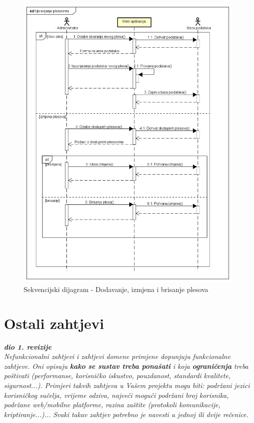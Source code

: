 		\begin{figure}[H]
			\includegraphics[scale=0.4]{slike/SD-Upravljanje plesovima.PNG} %
			\centering
			\caption{Sekvencijski dijagram - Dodavanje, izmjena i brisanje plesova}
			\label{fig:administr}
		\end{figure}
		

				\eject
	
		\section{Ostali zahtjevi}
		
			\textbf{\textit{dio 1. revizije}}\\
		 
			 \textit{Nefunkcionalni zahtjevi i zahtjevi domene primjene dopunjuju funkcionalne zahtjeve. Oni opisuju \textbf{kako se sustav treba ponašati} i koja \textbf{ograničenja} treba poštivati (performanse, korisničko iskustvo, pouzdanost, standardi kvalitete, sigurnost...). Primjeri takvih zahtjeva u Vašem projektu mogu biti: podržani jezici korisničkog sučelja, vrijeme odziva, najveći mogući podržani broj korisnika, podržane web/mobilne platforme, razina zaštite (protokoli komunikacije, kriptiranje...)... Svaki takav zahtjev potrebno je navesti u jednoj ili dvije rečenice.}
			 
			 
			 
	